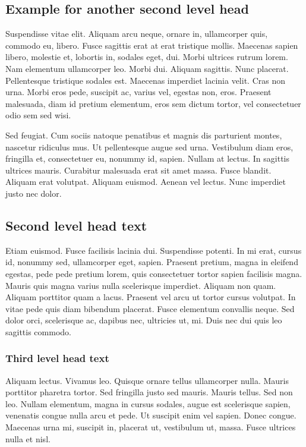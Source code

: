 \documentclass[APA,LATO1COL]{WileyNJD-v2}
\begin{document}
\subsection{Example for another second level head}

Suspendisse vitae elit. Aliquam arcu neque, ornare in, ullamcorper quis, commodo eu, libero. Fusce sagittis erat at
erat tristique mollis. Maecenas sapien libero, molestie et, lobortis in, sodales eget, dui. Morbi ultrices rutrum lorem.
Nam elementum ullamcorper leo. Morbi dui. Aliquam sagittis. Nunc placerat. Pellentesque tristique sodales est.
Maecenas imperdiet lacinia velit. Cras non urna. Morbi eros pede, suscipit ac, varius vel, egestas non, eros. Praesent
malesuada, diam id pretium elementum, eros sem dictum tortor, vel consectetuer odio sem sed wisi.

Sed feugiat. Cum sociis natoque penatibus et magnis dis parturient montes, nascetur ridiculus mus. Ut pellentesque
augue sed urna. Vestibulum diam eros, fringilla et, consectetuer eu, nonummy id, sapien. Nullam at lectus. In sagittis
ultrices mauris. Curabitur malesuada erat sit amet massa. Fusce blandit. Aliquam erat volutpat. Aliquam euismod.
Aenean vel lectus. Nunc imperdiet justo nec dolor.

\subsection{Second level head text}

Etiam euismod. Fusce facilisis lacinia dui. Suspendisse potenti. In mi erat, cursus id, nonummy sed, ullamcorper
eget, sapien. Praesent pretium, magna in eleifend egestas, pede pede pretium lorem, quis consectetuer tortor sapien
facilisis magna. Mauris quis magna varius nulla scelerisque imperdiet. Aliquam non quam. Aliquam porttitor quam
a lacus. Praesent vel arcu ut tortor cursus volutpat. In vitae pede quis diam bibendum placerat. Fusce elementum
convallis neque. Sed dolor orci, scelerisque ac, dapibus nec, ultricies ut, mi. Duis nec dui quis leo sagittis commodo.


\subsubsection{Third level head text}

Aliquam lectus. Vivamus leo. Quisque ornare tellus ullamcorper nulla. Mauris porttitor pharetra tortor. Sed fringilla
justo sed mauris. Mauris tellus. Sed non leo. Nullam elementum, magna in cursus sodales, augue est scelerisque
sapien, venenatis congue nulla arcu et pede. Ut suscipit enim vel sapien. Donec congue. Maecenas urna mi, suscipit
in, placerat ut, vestibulum ut, massa. Fusce ultrices nulla et nisl.
\end{document}
